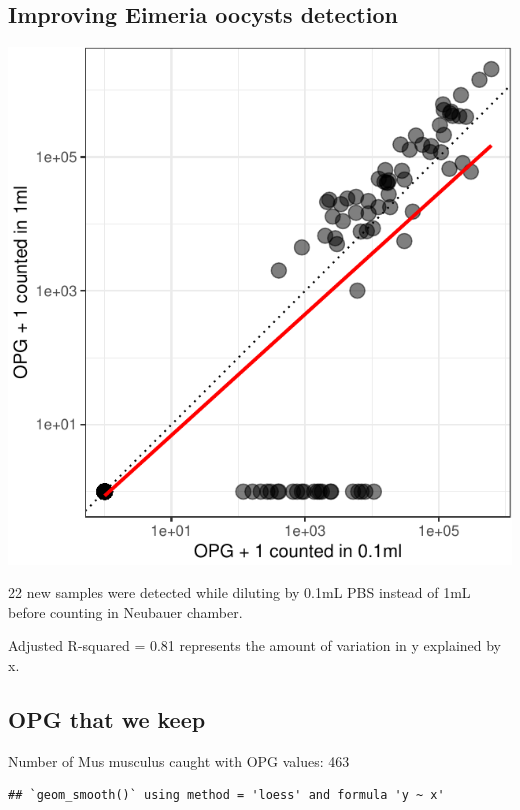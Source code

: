 \documentclass[]{article}
\begin{document}
\subsection{Improving Eimeria oocysts
detection}\label{improving-eimeria-oocysts-detection}

\includegraphics{Data_Analysis_Alice_files/figure-latex/oocystsDetec-1.pdf}

22 new samples were detected while diluting by 0.1mL PBS instead of 1mL
before counting in Neubauer chamber.

Adjusted R-squared = 0.81 represents the amount of variation in y
explained by x.

\subsection{OPG that we keep}\label{opg-that-we-keep}

Number of Mus musculus caught with OPG values: 463

\begin{verbatim}
## `geom_smooth()` using method = 'loess' and formula 'y ~ x'
\end{verbatim}
\end{document}
